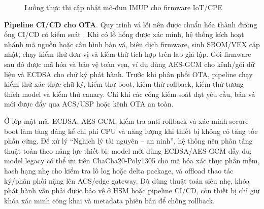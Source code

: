 \documentclass[../DoAn.tex]{subfiles}
\begin{document}
\begin{figure}[H]
    \centering
    \caption{Luồng thực thi cập nhật mô-đun IMUP cho firmware IoT/CPE}
    \label{fig:imup-flow}
\end{figure}

\textbf{Pipeline CI/CD cho OTA}. Quy trình vá lỗi nên được chuẩn hóa thành đường ống CI/CD có kiểm soát \cite{secureota2025}. Khi có lỗ hổng được xác minh, hệ thống kích hoạt nhánh mã nguồn hoặc cấu hình bản vá, biên dịch firmware, sinh SBOM/VEX cập nhật, chạy kiểm thử đơn vị và kiểm thử tích hợp trên lab giả lập. Gói firmware sau đó được mã hóa và bảo vệ toàn vẹn, ví dụ dùng AES-GCM cho kênh/gói dữ liệu và ECDSA cho chữ ký phát hành. Trước khi phân phối OTA, pipeline chạy kiểm thử xác thực chữ ký, kiểm thử boot, kiểm thử rollback, kiểm thử tương thích model và kiểm thử canary. Chỉ khi các cổng kiểm soát đạt yêu cầu, bản vá mới được đẩy qua ACS/USP hoặc kênh OTA an toàn.

Ở lớp mật mã, ECDSA, AES-GCM, kiểm tra anti-rollback và xác minh secure boot làm tăng đáng kể chi phí CPU và năng lượng khi thiết bị không có tăng tốc phần cứng. Để xử lý ``Nghịch lý tài nguyên -- an ninh'', hệ thống nên phân tầng thuật toán theo năng lực thiết bị: model mới dùng ECDSA/AES-GCM đầy đủ; model legacy có thể ưu tiên ChaCha20-Poly1305 cho mã hóa xác thực phần mềm, hash hạng nhẹ cho kiểm tra lô log hoặc delta package, và offload thao tác ký/phân phối nặng lên ACS/edge gateway. Dù dùng thuật toán siêu nhẹ, khóa phát hành vẫn phải được bảo vệ ở HSM hoặc pipeline CI/CD, còn thiết bị chỉ giữ khóa xác minh công khai và metadata phiên bản để chống rollback.
\end{document}
